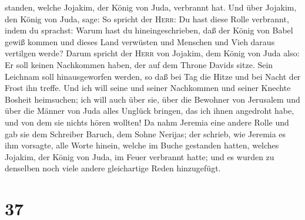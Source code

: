 standen, welche Jojakim, der König von Juda, verbrannt hat.
 Und über Jojakim, den König von Juda, sage: So spricht
der \textsc{Herr}: Du hast diese Rolle verbrannt, indem du sprachst:
Warum hast du hineingeschrieben, daß der König von Babel gewiß kommen
und dieses Land verwüsten und Menschen und Vieh daraus vertilgen werde?
 Darum spricht der \textsc{Herr} von Jojakim, dem König
von Juda also: Er soll keinen Nachkommen haben, der auf dem Throne
Davids sitze. Sein Leichnam soll hinausgeworfen werden, so daß bei Tag
die Hitze und bei Nacht der Frost ihn treffe.  Und ich
will seine und seiner Nachkommen und seiner Knechte Bosheit heimsuchen;
ich will auch über sie, über die Bewohner von Jerusalem und über die
Männer von Juda alles Unglück bringen, das ich ihnen angedroht habe, und
von dem sie nichts hören wollten!  Da nahm Jeremia eine
andere Rolle und gab sie dem Schreiber Baruch, dem Sohne Nerijas; der
schrieb, wie Jeremia es ihm vorsagte, alle Worte hinein, welche im Buche
gestanden hatten, welches Jojakim, der König von Juda, im Feuer
verbrannt hatte; und es wurden zu denselben noch viele andere
gleichartige Reden hinzugefügt.

\hypertarget{section-36}{%
\section{37}\label{section-36}}

